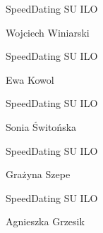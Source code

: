 \documentclass[a4paper,12pt]{article}
\begin{document}
\begin{minipage}[c]{\textwidth}
  \hline

  \hspace{0.5cm}

  SpeedDating SU ILO

  Wojciech Winiarski

  \hspace{0.5cm}

  \hline
\end{minipage}



\begin{minipage}[c]{\textwidth}
  \hline

  \hspace{0.5cm}

  SpeedDating SU ILO

  Ewa Kowol

  \hspace{0.5cm}

  \hline
\end{minipage}



\begin{minipage}[c]{\textwidth}
  \hline

  \hspace{0.5cm}

  SpeedDating SU ILO

  Sonia Świtońska

  \hspace{0.5cm}

  \hline
\end{minipage}



\begin{minipage}[c]{\textwidth}
  \hline

  \hspace{0.5cm}

  SpeedDating SU ILO

  Grażyna Szepe

  \hspace{0.5cm}

  \hline
\end{minipage}



\begin{minipage}[c]{\textwidth}
  \hline

  \hspace{0.5cm}

  SpeedDating SU ILO

  Agnieszka Grzesik

  \hspace{0.5cm}

  \hline
\end{minipage}
\end{document}
